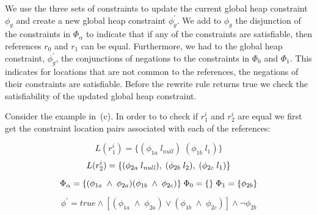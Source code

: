 We use the three sets of constraints to update the current global heap
constraint $\phi_g$ and create a new global heap constraint
$\phi_g^\prime$. We add to $\phi_g$ the disjunction of the constraints
in $\Phi_\alpha$ to indicate that if any of the constraints are
satisfiable, then references $r_0$ and $r_1$ can be
equal. Furthermore, we had to the global heap constraint,
$\phi_g^\prime$, the conjunctions of negations to the constraints in
$\Phi_0$ and $\Phi_1$. This indicates for locations that are not
common to the references, the negations of their constraints are
satisfiable. Before the rewrite rule returns true we check the
satisfiability of the updated global heap constraint.

Consider the example in~(c). In order to to check
if $r_1^i$ and $r_2^i$ are equal we first get the constraint location
pairs associated with each of the references:

\[
L(r_1^i) = \{ (\phi_{1a}\; l_\mathit{null})\; (\phi_{1b}\; l_1) \} 
\]
\[
L(r_2^i) = \{ (\phi_{2a}\; l_\mathit{null}),\; (\phi_{2b}\; l_2),\; (\phi_{2c}\; l_1) \} \\
\]


\[
\Phi_\alpha = \{ (\phi_{1a}\; \wedge\; \phi_{2a} ) (\phi_{1b}\; \wedge\; \phi_{2c} ) \}\;
\Phi_0 = \{ \}\; \Phi_1 = \{ \phi_{2b}\} \\
\]

\[
\phi^\prime = \mathit{true} \wedge [ (\phi_{1a}\; \wedge\; \phi_{2a} )\vee (\phi_{1b}\; \wedge\; \phi_{2c} ) ] \wedge \neg\phi_{2b} 
\]

